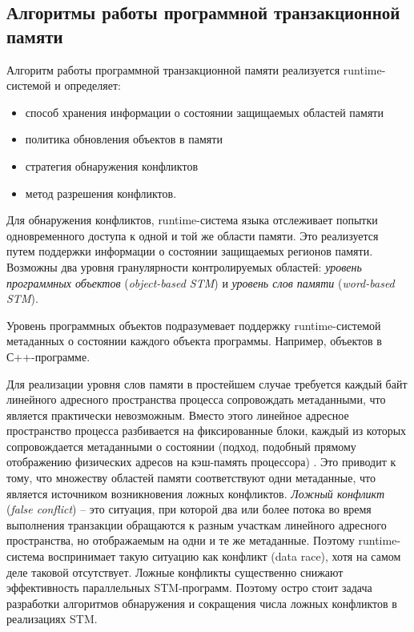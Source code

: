 \subsection{Алгоритмы работы программной транзакционной памяти}
Алгоритм работы программной транзакционной памяти реализуется runtime-системой и определяет:
\begin{itemize}
\item способ хранения информации о состоянии защищаемых областей памяти
\item политика обновления объектов в памяти
\item стратегия обнаружения конфликтов
\item метод разрешения конфликтов.
\end{itemize}

Для обнаружения конфликтов, runtime-система языка отслеживает попытки одновременного доступа к одной и той же области памяти. Это реализуется путем поддержки информации о состоянии защищаемых регионов памяти. Возможны два уровня гранулярности контролируемых областей: \textit{уровень программных объектов} (\textit{object-based STM}) и \textit{уровень слов памяти} (\textit{word-based STM}).

Уровень программных объектов подразумевает поддержку runtime-системой метаданных о состоянии каждого объекта программы. Например, объектов в С++-программе.

Для реализации уровня слов памяти в простейшем случае требуется каждый байт линейного адресного пространства процесса сопровождать метаданными, что является практически невозможным. Вместо этого линейное адресное пространство процесса разбивается на фиксированные блоки, каждый из которых сопровождается метаданными о состоянии (подход, подобный прямому отображению физических адресов на кэш-память процессора) \cite{felber_fetzer_marlier_riegel, riegel_felber_fetzer}. Это приводит к тому, что множеству областей памяти соответствуют одни метаданные, что является источником возникновения ложных конфликтов. \textit{Ложный конфликт} (\textit{false conflict}) -- это ситуация, при которой два или более потока во время выполнения транзакции обращаются к разным участкам линейного адресного пространства, но отображаемым на одни и те же метаданные. Поэтому runtime-система воспринимает такую ситуацию как конфликт (data race), хотя на самом деле таковой отсутствует. Ложные конфликты существенно снижают эффективность параллельных STM-программ. Поэтому остро стоит задача разработки алгоритмов обнаружения и сокращения числа ложных конфликтов в реализациях STM.

